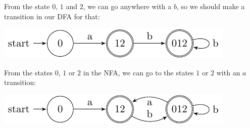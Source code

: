 From the state $0$, $1$ and $2$, we can go anywhere with a $b$, so we should
make a transition in our DFA for that:

\begin{center}
  \includegraphics{automata/9.pdf}
\end{center}

From the states $0$, $1$ or $2$ in the NFA, we can go to the states $1$ or $2$
with an $a$ transition:

\begin{center}
  \includegraphics{automata/10.pdf}
\end{center}
